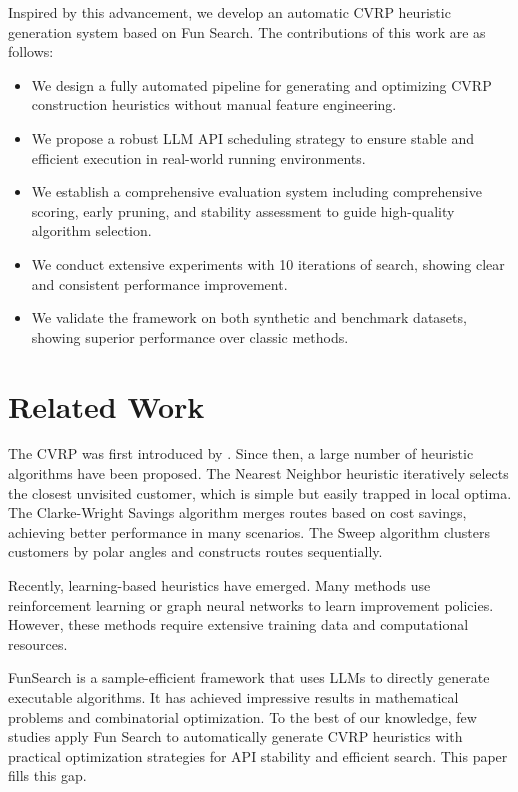 \documentclass{article}
\begin{document}
Inspired by this advancement, we develop an automatic CVRP heuristic generation system based on Fun Search. The contributions of this work are as follows:
\begin{itemize}
    \item We design a fully automated pipeline for generating and optimizing CVRP construction heuristics without manual feature engineering.
    \item We propose a robust LLM API scheduling strategy to ensure stable and efficient execution in real-world running environments.
    \item We establish a comprehensive evaluation system including comprehensive scoring, early pruning, and stability assessment to guide high-quality algorithm selection.
    \item We conduct extensive experiments with 10 iterations of search, showing clear and consistent performance improvement.
    \item We validate the framework on both synthetic and benchmark datasets, showing superior performance over classic methods.
\end{itemize}

\section{Related Work}

The CVRP was first introduced by \citet{dantzig1959}. Since then, a large number of heuristic algorithms have been proposed. The Nearest Neighbor heuristic iteratively selects the closest unvisited customer, which is simple but easily trapped in local optima. The Clarke-Wright Savings algorithm \citep{clarke1964} merges routes based on cost savings, achieving better performance in many scenarios. The Sweep algorithm \citep{gillet1974} clusters customers by polar angles and constructs routes sequentially.

Recently, learning-based heuristics have emerged. Many methods use reinforcement learning \citep{bello2016neural} or graph neural networks \citep{kool2018attention} to learn improvement policies. However, these methods require extensive training data and computational resources.

FunSearch \citep{romero2023funsearch} is a sample-efficient framework that uses LLMs to directly generate executable algorithms. It has achieved impressive results in mathematical problems and combinatorial optimization. To the best of our knowledge, few studies apply Fun Search to automatically generate CVRP heuristics with practical optimization strategies for API stability and efficient search. This paper fills this gap.
\end{document}
